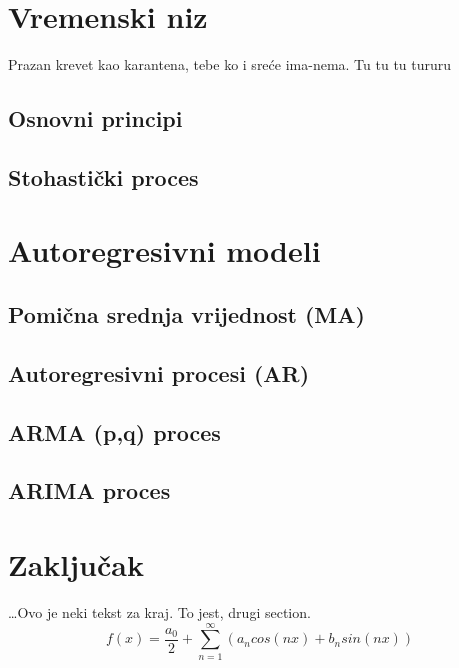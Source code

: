 \documentclass[a4paper,12pt,oneside]{memoir}
\newcommand{\fourierovred}{f(x)= \frac{a_0}{2}+\sum_{n=1}^\infty (a_n cos(nx)+b_n sin(nx))}
\begin{document}
    \chapter{Vremenski niz}

        Prazan krevet kao karantena, tebe ko i sreće ima-nema. Tu tu tu tururu

        \section{Osnovni principi}
        \section{Stohastički proces}
    \chapter{Autoregresivni modeli}
        \section{Pomična srednja vrijednost (MA)}
        \section{Autoregresivni procesi (AR)}
        \section{ARMA (p,q) proces}
        \section{ARIMA proces}
    \chapter{Zaključak}
        \ldots{}Ovo je neki tekst za kraj. To jest, drugi section.
        $$\fourierovred$$
\end{document}
